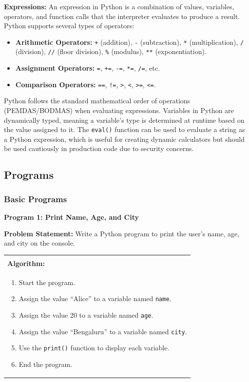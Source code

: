 \documentclass[12pt,a4paper]{article}
\makeatletter
\newenvironment{algobox}{%
  \par\vspace{4pt}%
  \noindent\begin{tabular}{@{}p{\linewidth}@{}}%
  \hline\\[-8pt]%
  \textbf{\color{blue!60!black}\small Algorithm:}\\[2pt]%
}{%
  \\[-4pt]\hline%
  \end{tabular}\par\vspace{4pt}%
}
\makeatother
\begin{document}
\textbf{Expressions:}
An expression in Python is a combination of values, variables, operators, and function calls that the interpreter evaluates to produce a result. Python supports several types of operators:
\begin{itemize}
  \item \textbf{Arithmetic Operators:} \texttt{+} (addition), \texttt{-} (subtraction), \texttt{*} (multiplication), \texttt{/} (division), \texttt{//} (floor division), \texttt{\%} (modulus), \texttt{**} (exponentiation).
  \item \textbf{Assignment Operators:} \texttt{=}, \texttt{+=}, \texttt{-=}, \texttt{*=}, \texttt{/=}, etc.
  \item \textbf{Comparison Operators:} \texttt{==}, \texttt{!=}, \texttt{>}, \texttt{<}, \texttt{>=}, \texttt{<=}.
\end{itemize}

Python follows the standard mathematical order of operations (PEMDAS/BODMAS) when evaluating expressions. Variables in Python are dynamically typed, meaning a variable's type is determined at runtime based on the value assigned to it. The \texttt{eval()} function can be used to evaluate a string as a Python expression, which is useful for creating dynamic calculators but should be used cautiously in production code due to security concerns.

\subsection{Programs}
\subsubsection{Basic Programs}

\textbf{Program 1: Print Name, Age, and City}

\textbf{Problem Statement:}
Write a Python program to print the user's name, age, and city on the console.

\begin{algobox}
\begin{enumerate}[label=Step \arabic*:]
  \item Start the program.
  \item Assign the value ``Alice'' to a variable named \texttt{name}.
  \item Assign the value 20 to a variable named \texttt{age}.
  \item Assign the value ``Bengaluru'' to a variable named \texttt{city}.
  \item Use the \texttt{print()} function to display each variable.
  \item End the program.
\end{enumerate}
\end{algobox}
\end{document}
